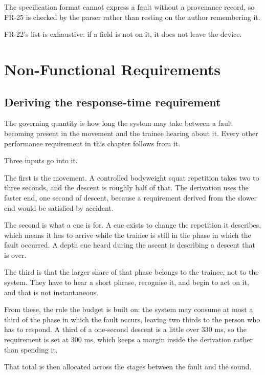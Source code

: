 The specification format cannot express a fault without a provenance record, so FR-25 is checked by the parser rather than resting on the author remembering it.

FR-22's list is exhaustive: if a field is not on it, it does not leave the device.

\section{Non-Functional Requirements}
\label{sec:3.4}

\subsection{Deriving the response-time requirement}
\label{sec:3.4.1}

The governing quantity is how long the system may take between a fault becoming present in the movement and the trainee hearing about it. Every other performance requirement in this chapter follows from it.

Three inputs go into it.

The first is the movement. A controlled bodyweight squat repetition takes two to three seconds, and the descent is roughly half of that. The derivation uses the faster end, one second of descent, because a requirement derived from the slower end would be satisfied by accident.

The second is what a cue is for. A cue exists to change the repetition it describes, which means it has to arrive while the trainee is still in the phase in which the fault occurred. A depth cue heard during the ascent is describing a descent that is over.

The third is that the larger share of that phase belongs to the trainee, not to the system. They have to hear a short phrase, recognise it, and begin to act on it, and that is not instantaneous.

From these, the rule the budget is built on: the system may consume at most a third of the phase in which the fault occurs, leaving two thirds to the person who has to respond. A third of a one-second descent is a little over 330 ms, so the requirement is set at 300 ms, which keeps a margin inside the derivation rather than spending it.

That total is then allocated across the stages between the fault and the sound.

